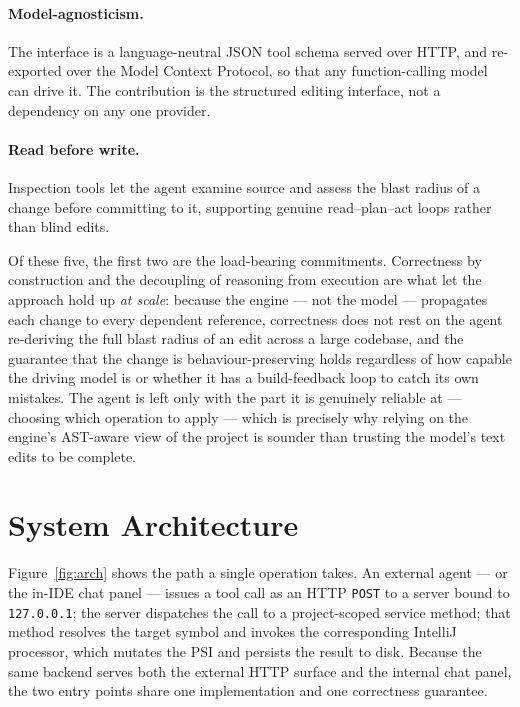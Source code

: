 \paragraph{Model-agnosticism.} The interface is a language-neutral JSON tool
schema served over HTTP, and re-exported over the Model Context Protocol, so that
any function-calling model can drive it. The contribution is the structured
editing interface, not a dependency on any one provider.

\paragraph{Read before write.} Inspection tools let the agent examine source and
assess the blast radius of a change before committing to it, supporting genuine
read--plan--act loops rather than blind edits.

Of these five, the first two are the load-bearing commitments. Correctness by
construction and the decoupling of reasoning from execution are what let the approach
hold up \emph{at scale}: because the engine --- not the model --- propagates each
change to every dependent reference, correctness does not rest on the agent
re-deriving the full blast radius of an edit across a large codebase, and the
guarantee that the change is behaviour-preserving holds regardless of how capable the
driving model is or whether it has a build-feedback loop to catch its own mistakes.
The agent is left only with the part it is genuinely reliable at --- choosing which
operation to apply --- which is precisely why relying on the engine's AST-aware view
of the project is sounder than trusting the model's text edits to be complete.

\section{System Architecture}
\label{sec:design-architecture}

Figure~\ref{fig:arch} shows the path a single operation takes. An external agent
--- or the in-IDE chat panel --- issues a tool call as an HTTP \texttt{POST} to a
server bound to \texttt{127.0.0.1}; the server dispatches the call to a
project-scoped service method; that method resolves the target symbol and invokes
the corresponding IntelliJ processor, which mutates the PSI and persists the
result to disk. Because the same backend serves both the external HTTP surface
and the internal chat panel, the two entry points share one implementation and
one correctness guarantee.


